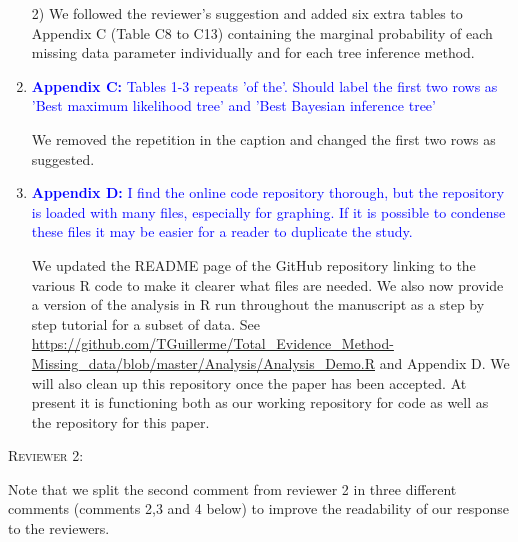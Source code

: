\documentclass[12pt,letterpaper]{article}
\renewcommand{\section}[1]{%
\bigskip
\begin{center}
\begin{Large}
\normalfont\scshape #1
\medskip
\end{Large}
\end{center}}
\begin{document}
\begin{enumerate}
2) We followed the reviewer's suggestion and added six extra tables to Appendix C (Table C8 to C13) containing the marginal probability of each missing data parameter individually and for each tree inference method.

\item{\textcolor{blue}{\textbf{Appendix C:} Tables 1-3 repeats 'of the'. Should label the first two rows as 'Best maximum likelihood tree' and 'Best Bayesian inference tree'}}

We removed the repetition in the caption and changed the first two rows as suggested.


\item{\textcolor{blue}{\textbf{Appendix D:} I find the online code repository thorough, but the repository is loaded with many files, especially for graphing. If it is possible to condense these files it may be easier for a reader to duplicate the study.}}

We updated the README page of the GitHub repository linking to the various R code to make it clearer what files are needed.
We also now provide a version of the analysis in R run throughout the manuscript as a step by step tutorial for a subset of data.
See \url{https://github.com/TGuillerme/Total_Evidence_Method-Missing_data/blob/master/Analysis/Analysis_Demo.R} and Appendix D.
We will also clean up this repository once the paper has been accepted.
At present it is functioning both as our working repository for code as well as the repository for this paper.

\end{enumerate}

\section{Reviewer 2:}
Note that we split the second comment from reviewer 2 in three different comments (comments 2,3 and 4 below) to improve the readability of our response to the reviewers.
\end{document}
